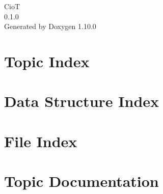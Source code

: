 \documentclass[twoside]{book}
\newcommand{\+}{\discretionary{\mbox{\scriptsize$\hookleftarrow$}}{}{}}
\newcommand{\clearemptydoublepage}{%
    \newpage{\pagestyle{empty}\cleardoublepage}%
  }
\begin{document}
  \raggedbottom
    \hypersetup{pageanchor=false,
                bookmarksnumbered=true,
                pdfencoding=unicode
               }
  \begin{titlepage}
  \vspace*{7cm}
  \begin{center}%
  {\Large CioT}\\
  [1ex]\large 0.\+1.\+0 \\
  \vspace*{1cm}
  {\large Generated by Doxygen 1.10.0}\\
  \end{center}
  \end{titlepage}
  \clearemptydoublepage
  \tableofcontents
  \clearemptydoublepage
  \hypersetup{pageanchor=true}
\chapter{Topic Index}

\chapter{Data Structure Index}

\chapter{File Index}

\chapter{Topic Documentation}




\end{document}
